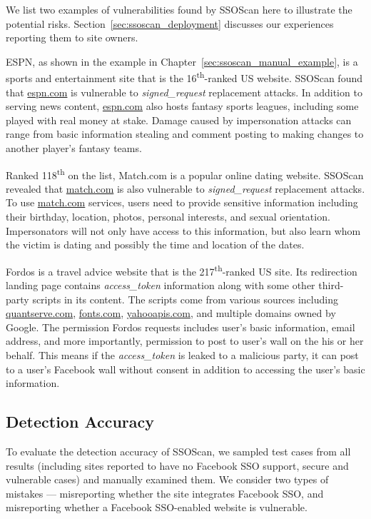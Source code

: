  We list two examples of vulnerabilities found by SSOScan here to illustrate the potential risks.  Section~\ref{sec:ssoscan_deployment} discusses our experiences reporting them to site owners.

 ESPN, as shown in the example in Chapter~\ref{sec:ssoscan_manual_example}, is a sports and entertainment site that is the 16\textsuperscript{th}-ranked US website.  SSOScan found that \url{espn.com} is vulnerable to \emph{signed\_request} replacement attacks.  In addition to serving news content, \url{espn.com} also hosts fantasy sports leagues, including some played with real money at stake.  Damage caused by impersonation attacks can range from basic information stealing and comment posting to making changes to another player's fantasy teams.

 Ranked 118\textsuperscript{th} on the list, Match.com is a popular online dating website.  SSOScan revealed that \url{match.com} is also vulnerable to \emph{signed\_request} replacement attacks.  To use \url{match.com} services, users need to provide sensitive information including their birthday, location, photos, personal interests, and sexual orientation.  Impersonators will not only have access to this information, but also learn whom the victim is dating and possibly the time and location of the dates.

 Fordos is a travel advice website that is the 217\textsuperscript{th}-ranked US site.  Its redirection landing page contains \emph{access\_token} information along with some other third-party scripts in its content.  The scripts come from various sources including \url{quantserve.com}, \url{fonts.com}, \url{yahooapis.com}, and multiple domains owned by Google.  The permission Fordos requests includes user's basic information, email address, and more importantly, permission to post to user's wall on the his or her behalf. This means if the \emph{access\_token} is leaked to a malicious party, it can post to a user's Facebook wall without consent in addition to accessing the user's basic information. 


\subsection{Detection Accuracy}
\label{sec:toolEffectiveness}
To evaluate the detection accuracy of SSOScan, we sampled test cases from all results (including sites reported to have no Facebook SSO support, secure and vulnerable cases) and manually examined them.  We consider two types of mistakes --- misreporting whether the site integrates Facebook SSO, and misreporting whether a Facebook SSO-enabled website is vulnerable.  

